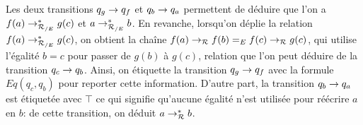 \begin{example}
  Les deux transitions $q_g \rightarrow q_f$ et $q_b \rightarrow q_a$ permettent de déduire que l'on a $f(a) \rightarrow^*_{\mathcal R_{/E}} g(c)$
  et $a \rightarrow^*_{\mathcal R_{/E}} b$. En revanche, lorsqu'on déplie la relation $f(a) \rightarrow^*_{\mathcal R_{/E}} g(c)$, on obtient la chaîne
  $f(a) \rightarrow_\mathcal R f(b) =_E f(c) \rightarrow_\mathcal R g(c)$, qui utilise l'égalité $b = c$ pour passer de $g(b)$ à $g(c)$, relation que l'on peut 
  déduire de la transition $q_c \rightarrow q_b$. Ainsi, on étiquette la transition $q_g \rightarrow q_f$
  avec la formule $Eq(q_c, q_b)$ pour reporter cette information. 
  D'autre part, la transition $q_b \rightarrow q_a$ est étiquetée avec $\top$ ce qui signifie 
  qu'aucune égalité n'est utilisée pour réécrire $a$ en $b$: de cette transition, on déduit $a \rightarrow^*_\mathcal R b$.
  \begin{center}
  \end{center}
\end{example}

